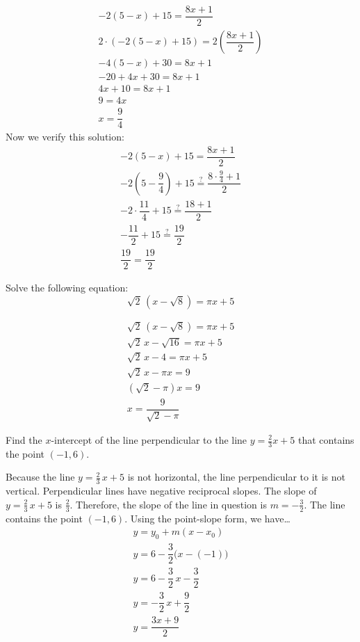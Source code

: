 \documentclass[11pt,letterpaper]{article}
\begin{document}
\sol 
	\[
	\begin{gathered}
	-2(5 - x) + 15= \dfrac{8x + 1}{2} \\[0.3cm] 
	2 \cdot \left( -2(5 - x) + 15 \right)= 2 \left( \dfrac{8x + 1}{2} \right) \\[0.3cm]
	-4(5 - x) + 30= 8x + 1 \\[0.3cm]
	-20 + 4x + 30= 8x + 1 \\[0.3cm]
	4x + 10= 8x + 1 \\[0.3cm]
	9= 4x \\[0.3cm]
	x= \dfrac{9}{4}
	\end{gathered}
	\] \pspace
Now we verify this solution:
	\[
	\begin{gathered}
	-2(5 - x) + 15= \dfrac{8x + 1}{2} \\[0.3cm]
	-2 \left(5 - \dfrac{9}{4} \right) + 15 \stackrel{?}{=} \dfrac{8 \cdot \frac{9}{4} + 1}{2} \\[0.3cm] 
	-2 \cdot \dfrac{11}{4} + 15 \stackrel{?}{=} \dfrac{18 + 1}{2} \\[0.3cm]
	-\dfrac{11}{2} + 15 \stackrel{?}{=} \dfrac{19}{2} \\[0.3cm]
	\dfrac{19}{2}= \dfrac{19}{2}
	\end{gathered}
	\]



\newpage



 Solve the following equation:
	\[
	\sqrt{2}\, (x - \sqrt{8})= \pi x + 5
	\] \pspace

\sol 
	\[
	\begin{gathered}
	\sqrt{2}\, (x - \sqrt{8})= \pi x + 5 \\[0.3cm]
	\sqrt{2} \,x - \sqrt{16}= \pi x + 5 \\[0.3cm]
	\sqrt{2} \,x - 4= \pi x + 5 \\[0.3cm]
	\sqrt{2}\,x - \pi x= 9 \\[0.3cm]
	(\sqrt{2} - \pi)x= 9 \\[0.3cm]
	x= \dfrac{9}{\sqrt{2} - \pi}
	\end{gathered}
	\]



\newpage



 Find the $x$-intercept of the line perpendicular to the line $y= \frac{2}{3}x + 5$ that contains the point $(-1, 6)$. \pspace

\sol Because the line $y= \frac{2}{3}\,x + 5$ is not horizontal, the line perpendicular to it is not vertical. Perpendicular lines have negative reciprocal slopes. The slope of $y= \frac{2}{3}\,x + 5$ is $\frac{2}{3}$. Therefore, the slope of the line in question is $m= -\frac{3}{2}$. The line contains the point $(-1, 6)$. Using the point-slope form, we have\dots
	\[
	\begin{gathered}
	y= y_0 + m(x - x_0) \\[0.3cm]
	y= 6 - \dfrac{3}{2} \big(x - (-1) \big) \\[0.3cm]
	y= 6 - \dfrac{3}{2}\,x - \dfrac{3}{2} \\[0.3cm]
	y= -\dfrac{3}{2}\,x + \dfrac{9}{2} \\[0.3cm]
	y= \dfrac{3x + 9}{2} 
	\end{gathered}
	\]
\end{document}
